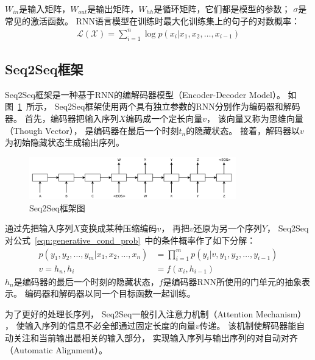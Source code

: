 $W_{in}$是输入矩阵，$W_{out}$是输出矩阵，$W_{hh}$是循环矩阵，它们都是模型的参数；
$\sigma$是常见的激活函数。
RNN语言模型在训练时最大化训练集上的句子的对数概率：
\begin{align}
    \mathcal{L(X)} = \sum_{i=1}^n \log p(x_i|x_1, x_2, \dots, x_{i-1})
\end{align}

\subsection{Seq2Seq框架}\label{subsec:Seq2Seq}
Seq2Seq框架是一种基于RNN的编解码器模型（Encoder-Decoder Model）。
如图~\ref{fig:Seq2Seq}~所示，
Seq2Seq框架使用两个具有独立参数的RNN分别作为编码器和解码器。
首先，编码器把输入序列$X$编码成一个定长向量$v$，
该向量又称为思维向量（Though Vector），
是编码器在最后一个时刻$t_{n}$的隐藏状态。
接着，解码器以$v$为初始隐藏状态生成输出序列。
\begin{figure}[H]
    \centering
    \includegraphics[width=0.8\textwidth]{figure/Seq2Seq.png}
    \caption{Seq2Seq框架图}
    \label{fig:Seq2Seq}
\end{figure}

通过先把输入序列$X$变换成某种压缩编码$v$，
再把$v$还原为另一个序列$Y$，
Seq2Seq对公式~\ref{eqn:generative_cond_prob}~中的条件概率作了如下分解：
\begin{align}
    p(y_1, y_2, \dots, y_m|x_1, x_2, \dots, x_n) &= \prod_{i=1}^m p(y_i|v, y_1, y_2, \dots, y_{i-1}) \\
    v = h_n, h_i &= f(x_i ,h_{i-1})
\end{align}
$h_n$是编码器的最后一个时刻的隐藏状态，$f$是编码器RNN所使用的门单元的抽象表示。
编码器和解码器以同一个目标函数一起训练。

为了更好的处理长序列，
Seq2Seq一般引入注意力机制（Attention Mechanism）
，
使输入序列的信息不必全部通过固定长度的向量$v$传递。
该机制使解码器能自动关注和当前输出最相关的输入部分，
实现输入序列与输出序列的对自动对齐（Automatic Alignment）。

